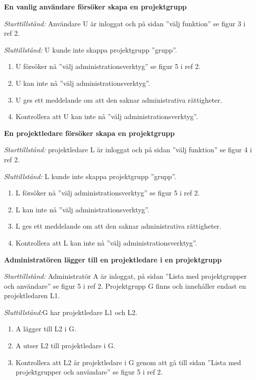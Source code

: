 \documentclass[a4paper]{article}
\begin{document}
\begin{FT}
\item %
\textbf{En vanlig användare försöker skapa en projektgrupp}

\emph{Starttillstånd:} Användare U är inloggat och på sidan ''välj funktion'' se figur 3 i ref 2.

\emph{Sluttillstånd:} U kunde inte skappa projektgrupp ''grupp''.

\begin{enumerate}
\item U försöker nå ''välj administrationsverktyg'' se figur 5 i ref 2.
\item U kan inte nå ''välj administrationsverktyg''.
\item U ges ett meddelande om att den saknar administrativa rättigheter.
\item Kontrollera att U kan inte nå ''välj administrationsverktyg''.
\end{enumerate}

\item %
\textbf{En projektledare försöker skapa en projektgrupp}

\emph{Starttillstånd:} projektledare L är inloggat och på sidan ''välj funktion'' se figur 4 i ref 2.

\emph{Sluttillstånd:} L kunde inte skappa projektgrupp ''grupp''.

\begin{enumerate}
\item L försöker nå ''välj administrationsverktyg'' se figur 5 i ref 2.
\item L kan inte nå ''välj administrationsverktyg''.
\item L ges ett meddelande om att den saknar administrativa rättigheter.
\item Kontrollera att L kan inte nå ''välj administrationsverktyg''.
\end{enumerate}

\item %
\textbf{Administratören lägger till en projektledare i en projektgrupp}

\emph{Starttillstånd:} Administratör A är inloggat, på sidan ''Lista med projektgrupper och användare'' se figur 5 i ref 2. Projektgrupp G finns och innehåller endast en projektledaren L1.

\emph{Sluttillstånd:}G har projektledare L1 och L2.

\begin{enumerate}
\item A lägger till L2 i G.
\item A utser L2 till projektledare i G.
\item Kontrollera att L2 är projektledare i G genom att gå till sidan ''Lista med projektgrupper och användare'' se figur 5 i ref 2.
\end{enumerate}


\end{FT}
\end{document}

